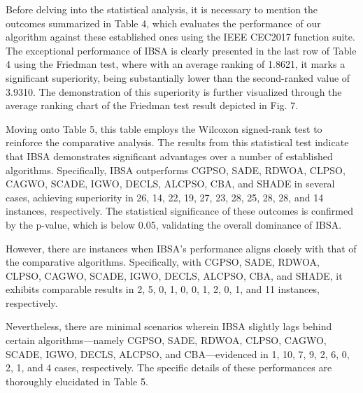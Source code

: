 \documentclass{article} %
\begin{document}
Before delving into the statistical analysis, it is necessary to mention the outcomes summarized in Table 4, which evaluates the performance of our algorithm against these established ones using the IEEE CEC2017 function suite. The exceptional performance of IBSA is clearly presented in the last row of Table 4 using the Friedman test, where with an average ranking of 1.8621, it marks a significant superiority, being substantially lower than the second-ranked value of 3.9310. The demonstration of this superiority is further visualized through the average ranking chart of the Friedman test result depicted in Fig. 7.

Moving onto Table 5, this table employs the Wilcoxon signed-rank test to reinforce the comparative analysis. The results from this statistical test indicate that IBSA demonstrates significant advantages over a number of established algorithms. Specifically, IBSA outperforms CGPSO, SADE, RDWOA, CLPSO, CAGWO, SCADE, IGWO, DECLS, ALCPSO, CBA, and SHADE in several cases, achieving superiority in 26, 14, 22, 19, 27, 23, 28, 25, 28, 28, and 14 instances, respectively. The statistical significance of these outcomes is confirmed by the p-value, which is below 0.05, validating the overall dominance of IBSA.

However, there are instances when IBSA's performance aligns closely with that of the comparative algorithms. Specifically, with CGPSO, SADE, RDWOA, CLPSO, CAGWO, SCADE, IGWO, DECLS, ALCPSO, CBA, and SHADE, it exhibits comparable results in 2, 5, 0, 1, 0, 0, 1, 2, 0, 1, and 11 instances, respectively.

Nevertheless, there are minimal scenarios wherein IBSA slightly lags behind certain algorithms---namely CGPSO, SADE, RDWOA, CLPSO, CAGWO, SCADE, IGWO, DECLS, ALCPSO, and CBA---evidenced in 1, 10, 7, 9, 2, 6, 0, 2, 1, and 4 cases, respectively. The specific details of these performances are thoroughly elucidated in Table 5.
\end{document}
